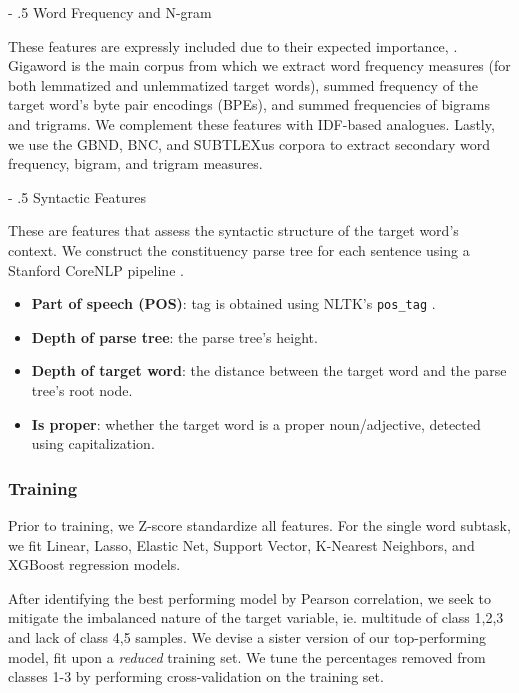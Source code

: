 \documentclass[11pt,a4paper]{article}
\makeatletter
\renewcommand\paragraph{%
    \@startsection{paragraph}{4}{0mm}%
        {-\baselineskip}%
        {.5\baselineskip}%
        {\normalfont\normalsize\bfseries}}
\makeatother
\begin{document}
\paragraph{Word Frequency and N-gram}

These features are expressly included due to their expected importance, \citep{zampieriEtAl:2017:NLPTEA}. Gigaword is the main corpus from which we extract word frequency measures (for both lemmatized and unlemmatized target words), summed frequency of the target word's byte pair encodings (BPEs), and summed frequencies of bigrams and trigrams. We complement these features with IDF-based analogues. Lastly, we use the GBND, BNC, and SUBTLEXus corpora to extract secondary word frequency, bigram, and trigram measures. 

\paragraph{Syntactic Features}

These are features that assess the syntactic structure of the target word's context. We construct the constituency parse tree for each sentence using a Stanford CoreNLP pipeline \citep{manning-EtAl:2014:P14-5}.

\begin{itemize}
  \item \textbf{Part of speech (POS)}: tag is obtained using NLTK's \texttt{pos\_tag} \citep{Loper02nltk:the}.
  \item \textbf{Depth of parse tree}: the parse tree's height.
  \item \textbf{Depth of target word}: the distance between the target word and the parse tree's root node.
  \item \textbf{Is proper}: whether the target word is a proper noun/adjective, detected using capitalization.
\end{itemize}

\subsubsection{Training}

Prior to training, we Z-score standardize all features. For the single word subtask, we fit Linear, Lasso, Elastic Net, Support Vector, K-Nearest Neighbors, and XGBoost regression models. 

After identifying the best performing model by Pearson correlation, we seek to mitigate the imbalanced nature of the target variable, ie. multitude of class 1,2,3 and lack of class 4,5 samples. We devise a sister version of our top-performing model, fit upon a \textit{reduced} training set. We tune the percentages removed from classes 1-3 by performing cross-validation on the training set.
\end{document}
